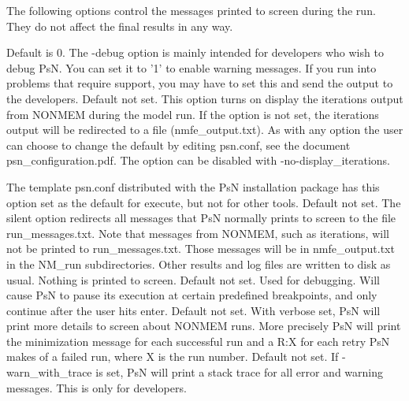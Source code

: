 The following options control the messages printed to screen during the run. They do not affect the final results in any way.
\begin{optionlist}
Default is 0. The -debug option is mainly intended for developers who wish to debug PsN. You can set it to '1' to enable warning messages. If you run into problems that require support, you may have to set this and send the output to the developers. 
\nextopt
{}
Default not set.  This option turns on display the iterations output from NONMEM during the model run. If the option is not set, the iterations output will be redirected to a file (nmfe\_output.txt). As with any option the user can choose to change the default by editing psn.conf, see the document psn\_configuration.pdf. The option can be disabled with -no-display\_iterations.

The template psn.conf distributed with the PsN installation package has this option set as the default for execute, but not for other tools.  
\nextopt
{}
Default not set. The silent option redirects all messages that PsN normally prints to screen to the file run\_messages.txt. Note that messages from NONMEM, such as iterations, will not be printed to run\_messages.txt. Those messages will be in nmfe\_output.txt in the NM\_run subdirectories. Other results and log files are written to disk as usual. Nothing is printed to screen. 
\nextopt
{}
Default not set. Used for debugging. Will cause PsN to pause its execution at certain predefined breakpoints, and only continue after the user hits enter.
\nextopt
{}
Default not set. With verbose set, PsN will print more details to screen about NONMEM runs. More precisely PsN will print the minimization message for each successful run and a R:X for each retry PsN makes of a failed run, where X is the run number. 
\nextopt
{}
Default not set. If -warn\_with\_trace is set, PsN will print a stack trace for all error and warning messages. This is only for developers. 
\nextopt
\end{optionlist}
